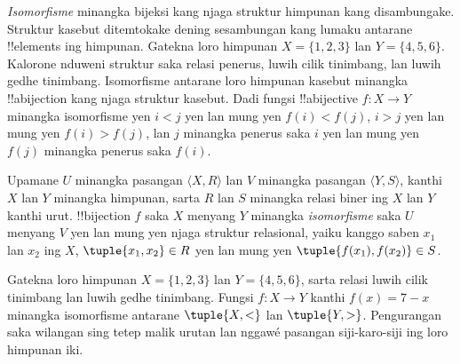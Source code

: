 \documentclass[../../../include/open-logic-section]{subfiles}
\begin{document}

\begin{explain}
\emph{Isomorfisme} minangka bijeksi kang njaga struktur himpunan kang
disambungake. Struktur kasebut ditemtokake dening sesambungan kang
lumaku antarane !!{element}s ing himpunan. Gatekna loro himpunan
$X=\{1,2,3\}$ lan $Y=\{4,5,6\}$. Kalorone nduweni struktur
saka relasi penerus, luwih cilik tinimbang, lan luwih gedhe tinimbang.
Isomorfisme antarane loro himpunan kasebut minangka !!a{bijection}
kang njaga struktur kasebut. Dadi fungsi !!a{bijective}
$f \colon X \to Y$ minangka isomorfisme yen $i<j$ yen lan mung yen
$f(i)<f(j)$, $i>j$ yen lan mung yen $f(i)>f(j)$, lan $j$
minangka penerus saka $i$ yen lan mung yen $f(j)$ minangka penerus
saka $f(i)$.
\end{explain}

\begin{defn}[Isomorfisme]
Upamane $U$ minangka pasangan $\langle X, R\rangle$ lan $V$
minangka pasangan $\langle Y, S\rangle$, kanthi $X$ lan $Y$
minangka himpunan, sarta $R$ lan $S$ minangka relasi biner ing $X$ lan
$Y$ kanthi urut. !!{bijection} $f$ saka $X$ menyang $Y$ minangka
\emph{isomorfisme} saka $U$ menyang $V$ yen lan mung yen njaga
struktur relasional, yaiku kanggo saben $x_{1}$ lan $x_{2}$ ing $X$,
$\tuple{x_1,x_2} \in R$ yen lan mung yen
$\tuple{f(x_1),f(x_2)} \in S$.
\end{defn}

\begin{ex}
Gatekna loro himpunan $X=\{1,2,3\}$ lan $Y=\{4,5,6\}$,
sarta relasi luwih cilik tinimbang lan luwih gedhe tinimbang.
Fungsi $f\colon X \to Y$ kanthi $f(x) = 7-x$ minangka
isomorfisme antarane $\tuple{X,<}$ lan $\tuple{Y,>}$.
Pengurangan saka wilangan sing tetep malik urutan lan nggawé
pasangan siji-karo-siji ing loro himpunan iki.
\end{ex}
\end{document}
